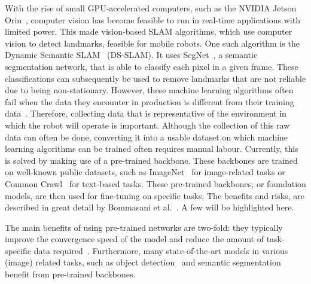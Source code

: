 With the rise of small GPU-accelerated computers, such as the NVIDIA Jetson Orin~\cite{NVIDIA_Karumbunathan_2022}, computer vision has become feasible to run in real-time applications with limited power. This made vision-based SLAM algorithms, which use computer vision to detect landmarks, feasible for mobile robots. One such algorithm is the Dynamic Semantic SLAM~\cite{yu2018ds} (DS-SLAM). It uses SegNet~\cite{badri2017segnet}, a semantic segmentation network, that is able to classify each pixel in a given frame. These classifications can subsequently be used to remove landmarks that are not reliable due to being non-stationary. However, these machine learning algorithms often fail when the data they encounter in production is different from their training data~\cite{Goodfellow-et-al-2016,ozdag2018adversarial,warde201611,10.14778/3632093.3632098,DBLP:journals/corr/KurakinGB16a,10.1145/3422622}. Therefore, collecting data that is representative of the environment in which the robot will operate is important. Although the collection of this raw data can often be done, converting it into a usable dataset on which machine learning algorithms can be trained often requires manual labour. Currently, this is solved by making use of a pre-trained backbone. These backbones are trained on well-known public datasets, such as ImageNet~\cite{deng2009imagenet} for image-related tasks or Common Crawl~\cite{commoncrawl} for text-based tasks. These pre-trained backbones, or foundation models, are then used for fine-tuning on specific tasks. The benefits and risks, are described in great detail by Bommasani et al.~\cite{DBLP:journals/corr/abs-2108-07258}. A few will be highlighted here.

The main benefits of using pre-trained networks are two-fold: they typically improve the convergence speed of the model and reduce the amount of task-specific data required~\cite{donahue2014decaf,zeiler2014visualizing}. Furthermore, many state-of-the-art models in various (image) related tasks, such as object detection~\cite{liu2016ssd,redmon2016you} and semantic segmentation~\cite{orsic2019defense,girshick2014rich} benefit from pre-trained backbones.

